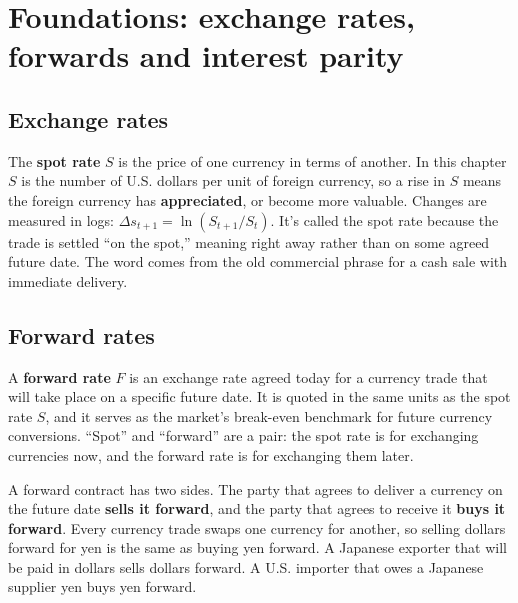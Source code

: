 \section{Foundations: exchange rates, forwards and interest parity}
\label{sec:06-foundations}

\subsection{Exchange rates}

The \textbf{spot rate} $S$ is the price of one currency in terms of another. In this chapter $S$ is the number of U.S. dollars per unit of foreign currency, so a rise in $S$ means the foreign currency has \textbf{appreciated}, or become more valuable. Changes are measured in logs: $\Delta s_{t+1} = \ln(S_{t+1}/S_t)$.
It’s called the spot rate because the trade is settled “on the spot,” meaning right away rather than on some agreed future date. The word comes from the old commercial phrase for a cash sale with immediate delivery.



\subsection{Forward rates}

A \textbf{forward rate} $F$ is an exchange rate agreed today for a currency trade that will take place on a specific future date. It is quoted in the same units as the spot rate $S$, and it serves as the market's break-even benchmark for future currency conversions.
“Spot” and “forward” are a pair: the spot rate is for exchanging currencies now, and the forward rate is for exchanging them later.

A forward contract has two sides. The party that agrees to deliver a currency on the future date \textbf{sells it forward}, and the party that agrees to receive it \textbf{buys it forward}. Every currency trade swaps one currency for another, so selling dollars forward for yen is the same as buying yen forward. A Japanese exporter that will be paid in dollars sells dollars forward. A U.S. importer that owes a Japanese supplier yen buys yen forward.

